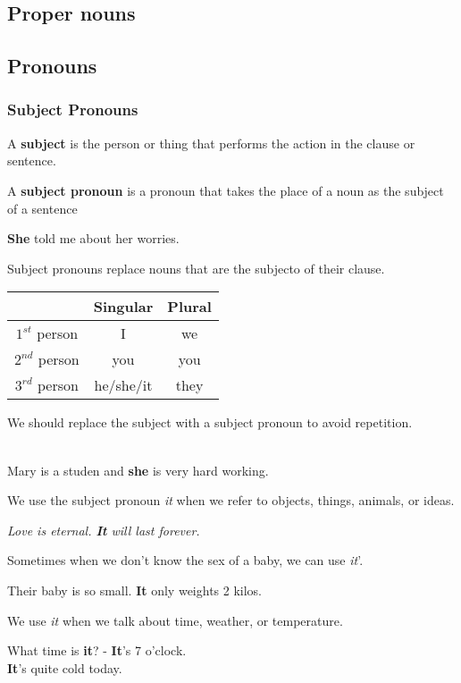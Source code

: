 \documentclass[10pt,a4paper]{article}
\begin{document}
\subsection{Proper nouns}
\subsection{Pronouns}
\subsubsection{Subject Pronouns}
A \textbf{subject} is the person or thing that performs the action in the clause or sentence.

A \textbf{subject pronoun} is a pronoun that takes the place of a noun as the subject of a sentence

\begin{center}
	\textbf{She} told me about her worries.
\end{center}
Subject pronouns replace nouns that are the subjecto of their clause.

\begin{center}
		\begin{tabular}{|c|c|c|}
		\hline
		& \textbf{Singular} & \textbf{Plural} \\
		\hline
		$1^{st}$ person & I & we \\
		$2^{nd}$ person & you & you \\
		$3^{rd}$ person & he/she/it & they \\
		\hline
	\end{tabular}
\end{center}
\newpage
We should replace the subject with a subject pronoun to avoid repetition.
\begin{center}
\\
Mary is a studen and \textbf{she} is very hard working.
\end{center}

We use the subject pronoun \textit{it} when we refer to objects, things, animals, or ideas.
\begin{center}
		\textit{ Love is eternal. \textbf{It} will last forever.}
\end{center}

Sometimes when we don't know the sex of a baby, we can use \textit{it}'.
\begin{center}
	Their baby is so small. \textbf{It} only weights 2 kilos.
\end{center}
\hspace{0.4cm} We use \textit{it} when we talk about time, weather, or temperature.
\begin{center}
	What time is \textbf{it}? - \textbf{It}'s 7 o'clock.\\
	\textbf{It}'s quite cold today.
\end{center}
\end{document}
